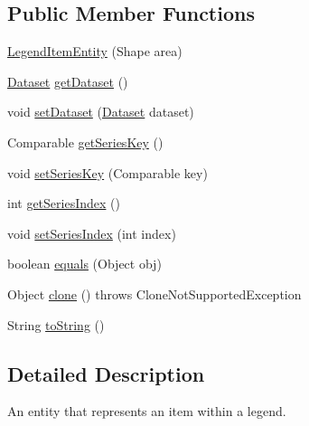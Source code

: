 \subsection*{Public Member Functions}
\begin{DoxyCompactItemize}
\item 
\mbox{\hyperlink{classorg_1_1jfree_1_1chart_1_1entity_1_1_legend_item_entity_a8d8d1d46a9dfd9c0605c3f808429810d}{Legend\+Item\+Entity}} (Shape area)
\item 
\mbox{\hyperlink{interfaceorg_1_1jfree_1_1data_1_1general_1_1_dataset}{Dataset}} \mbox{\hyperlink{classorg_1_1jfree_1_1chart_1_1entity_1_1_legend_item_entity_ab76bb71b76b7f94a2f67c8d56900927a}{get\+Dataset}} ()
\item 
void \mbox{\hyperlink{classorg_1_1jfree_1_1chart_1_1entity_1_1_legend_item_entity_aa00af89c7866832e592a4fef40785db3}{set\+Dataset}} (\mbox{\hyperlink{interfaceorg_1_1jfree_1_1data_1_1general_1_1_dataset}{Dataset}} dataset)
\item 
Comparable \mbox{\hyperlink{classorg_1_1jfree_1_1chart_1_1entity_1_1_legend_item_entity_adcd94e383c12091bc60065e4f73bac2a}{get\+Series\+Key}} ()
\item 
void \mbox{\hyperlink{classorg_1_1jfree_1_1chart_1_1entity_1_1_legend_item_entity_aad5679e1643d398bfd7f0eaed1a5d521}{set\+Series\+Key}} (Comparable key)
\item 
int \mbox{\hyperlink{classorg_1_1jfree_1_1chart_1_1entity_1_1_legend_item_entity_ab37af6a271e6d5d48afd0ff80a5a440d}{get\+Series\+Index}} ()
\item 
void \mbox{\hyperlink{classorg_1_1jfree_1_1chart_1_1entity_1_1_legend_item_entity_ab4fa4fb654292b30900965b21e4f904b}{set\+Series\+Index}} (int index)
\item 
boolean \mbox{\hyperlink{classorg_1_1jfree_1_1chart_1_1entity_1_1_legend_item_entity_af6082c02d3b0dab06e4f05624369f695}{equals}} (Object obj)
\item 
Object \mbox{\hyperlink{classorg_1_1jfree_1_1chart_1_1entity_1_1_legend_item_entity_a3fb235e6df8dbafb7338e6efde08ed24}{clone}} ()  throws Clone\+Not\+Supported\+Exception 
\item 
String \mbox{\hyperlink{classorg_1_1jfree_1_1chart_1_1entity_1_1_legend_item_entity_aef49c4970cac678742659a28c6792d71}{to\+String}} ()
\end{DoxyCompactItemize}


\subsection{Detailed Description}
An entity that represents an item within a legend. 

